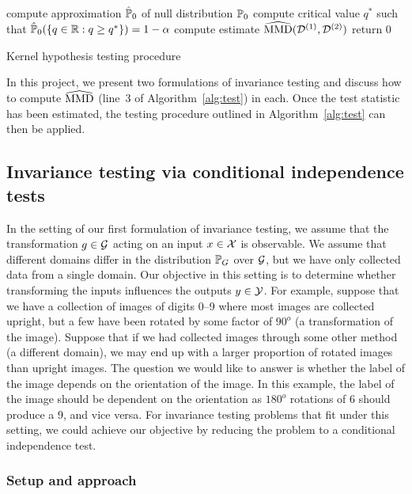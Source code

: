 \begin{algorithm}[H]
\SetAlgoLined
{}
\BlankLine
compute approximation $\hat{\P}_0$ of null distribution $\P_0$\;
compute critical value $q^*$ such that $\hat{\P}_0(\{q\in\bbR:q\geq q^*\})=1-\alpha$\;
compute estimate $\hatMMD(\calD^{(1)},\calD^{(2)})$\;
return 0\;
\caption{Kernel hypothesis testing procedure}
\label{alg:test}
\end{algorithm}
\vspace{1em}

In this project, we present two formulations of invariance testing and discuss how to compute $\hatMMD$ (line~3 of Algorithm~\ref{alg:test}) in each. Once the test statistic has been estimated, the testing procedure outlined in Algorithm~\ref{alg:test} can then be applied.


\subsection{Invariance testing via conditional independence tests} \label{sec:condind}

In the setting of our first formulation of invariance testing, we assume that the transformation $g\in\calG$ acting on an input $x\in\calX$ is observable. We assume that different domains differ in the distribution $\P_G$ over $\calG$, but we have only collected data from a single domain. Our objective in this setting is to determine whether transforming the inputs influences the outputs $y\in\calY$. For example, suppose that we have a collection of images of digits 0--9 where most images are collected upright, but a few have been rotated by some factor of $90^o$ (a transformation of the image). Suppose that if we had collected images through some other method (a different domain), we may end up with a larger proportion of rotated images than upright images. The question we would like to answer is whether the label of the image depends on the orientation of the image. In this example, the label of the image should be dependent on the orientation as $180^o$ rotations of 6 should produce a 9, and vice versa. For invariance testing problems that fit under this setting, we could achieve our objective by reducing the problem to a conditional independence test.

\subsubsection{Setup and approach}

